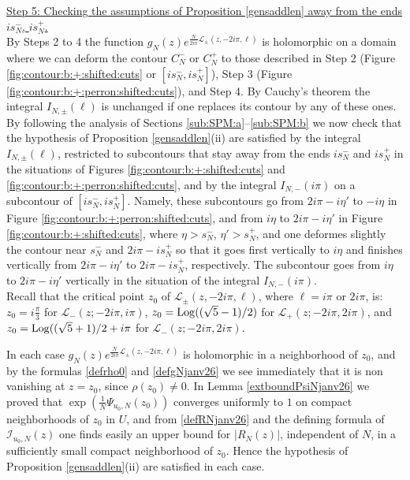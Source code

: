 \documentclass[11pt]{amsart}
\newcommand{\Log}{{\rm Log}}
\begin{document}
\underline{Step 5: Checking the assumptions of Proposition \ref{gensaddlen} away from the ends $is_N^-$, $is_N^+$.}\\
By Steps 2 to 4 the function $g_N(z)e^{\frac{N}{2i\pi}\mathcal{L}_\pm(z,-2i\pi,\ell)}$ is holomorphic on a domain where we can deform the contour $C_N^-$ or $C_N^+$ to those described in Step 2 (Figure \ref{fig:contour:b:+:shifted:cuts} or $[is_N^-,is_N^+]$), Step 3 (Figure \ref{fig:contour:b:+:perron:shifted:cuts}), and Step 4.  By Cauchy's theorem the integral $I_{N,\pm}(\ell)$ is unchanged if one replaces its contour by any of these ones.\\ 
By following the analysis of Sections \ref{sub:SPM:a}--\ref{sub:SPM:b} we now check that the hypothesis of Proposition \ref{gensaddlen}(ii) are satisfied by the integral $I_{N,\pm}(\ell)$, restricted to subcontours that stay away from the ends $is_N^-$ and $is_N^+$ in the situations of Figures \ref{fig:contour:b:+:shifted:cuts} and \ref{fig:contour:b:+:perron:shifted:cuts}, and by the integral $I_{N,-}(i\pi)$ on a subcontour of $[is_N^-,is_N^+]$. Namely, these subcontours go from $2i\pi-i\eta'$ to $-i\eta$ in Figure \ref{fig:contour:b:+:perron:shifted:cuts}, and from $i\eta$ to $2i\pi - i\eta'$ in Figure \ref{fig:contour:b:+:shifted:cuts}, where $\eta>s_N^-$, $\eta'>s_N^+$, and one deformes slightly the contour near $s_N^-$ and $2i\pi - is_N^+$ so that it goes first vertically to $i\eta$ and finishes vertically from $2i\pi - i\eta'$ to $2i\pi - is_N^+$, respectively. The subcontour goes from $i\eta$ to $2i\pi-i\eta'$ vertically in the situation of the integral $I_{N,-}(i\pi)$.\\
Recall that the critical point $z_0$ of $\mathcal{L}_{\pm}(z,-2i\pi,\ell)$, where $\ell=i\pi$ or $2i\pi$, is: $\textstyle z_0= i\frac{\pi}{3}$ for $\mathcal{L}_{-}(z;-2i\pi,i\pi)$, $\textstyle z_0= \Log((\sqrt{5}-1)/2)$ for $\mathcal{L}_{+}(z;-2i\pi,2i\pi)$, and $\textstyle z_0= \Log((\sqrt{5}+1)/2+i\pi$ for $\mathcal{L}_{-}(z;-2i\pi,2i\pi)$.

In each case $g_N(z)e^{\frac{N}{2i\pi}\mathcal{L}_\pm(z,-2i\pi,\ell)}$ is holomorphic in a neighborhood of $z_0$, and by the formulas \eqref{defrho0} and \eqref{defgNjanv26} we see immediately that it is non vanishing at $z=z_0$, since $\rho(z_0)\ne 0$. In Lemma \ref{extboundPsiNjanv26} we proved that $\textstyle \exp\left(\frac{1}{N}\Psi_{u_0,N}(z_0)\right)$ converges uniformly to $1$ on compact neighborhoods of $z_0$ in $U$, and from \eqref{defRNjanv26} and the defining formula of $\mathcal{I}_{u_0,N}(z)$ one finds easily an upper bound for $\vert R_N(z)\vert$, independent of $N$, in a sufficiently small compact neighborhood of $\textstyle z_0$. Hence the hypothesis of Proposition \ref{gensaddlen}(ii) are satisfied in each case.  
\end{document}
